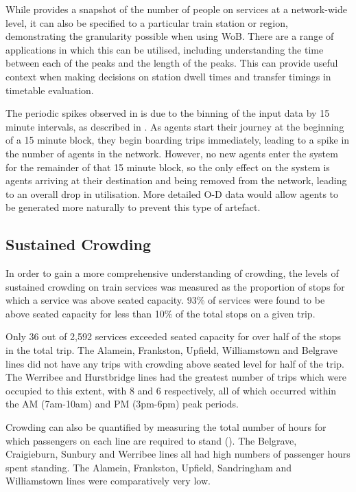 While  provides a snapshot of the number of people on services at a network-wide level, it can also be specified to a particular train station or region, demonstrating the granularity possible when using WoB. There are a range of applications in which this can be utilised, including understanding the time between each of the peaks and the length of the peaks. This can provide useful context when making decisions on station dwell times and transfer timings in timetable evaluation. 

The periodic spikes observed in  is due to the binning of the input data by 15 minute intervals, as described in . As agents start their journey at the beginning of a 15 minute block, they begin boarding trips immediately, leading to a spike in the number of agents in the network. However, no new agents enter the system for the remainder of that 15 minute block, so the only effect on the system is agents arriving at their destination and being removed from the network, leading to an overall drop in utilisation. More detailed O-D data would allow agents to be generated more naturally to prevent this type of artefact. 

\subsection{Sustained Crowding}
In order to gain a more comprehensive understanding of crowding, the levels of sustained crowding on train services was measured as the proportion of stops for which a service was above seated capacity. 93\% of services were found to be above seated capacity for less than 10\% of the total stops on a given trip.

Only 36 out of 2,592 services exceeded seated capacity for over half of the stops in the total trip. The Alamein, Frankston, Upfield, Williamstown and Belgrave lines did not have any trips with crowding above seated level for half of the trip. The Werribee and Hurstbridge lines had the greatest number of trips which were occupied to this extent, with 8 and 6 respectively, all of which occurred within the AM (7am-10am) and PM (3pm-6pm) peak periods. 

Crowding can also be quantified by measuring the total number of hours for which passengers on each line are required to stand (). The Belgrave, Craigieburn, Sunbury and Werribee lines all had high numbers of passenger hours spent standing. The Alamein, Frankston, Upfield, Sandringham and Williamstown lines were comparatively very low. 

